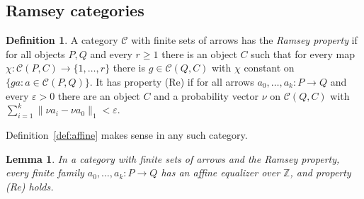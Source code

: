 \documentclass[11pt,a4paper]{article}
\newtheorem{lemma}[theorem]{Lemma}
\theoremstyle{definition}
\newtheorem{definition}[theorem]{Definition}
\newcommand{\C}{\mathcal{C}}
\newcommand{\Z}{\mathbb{Z}}
\begin{document}
\subsection{Ramsey categories}

\begin{definition}\label{def:RP}
A category $\C$ with finite sets of arrows has the \emph{Ramsey property}
if for all objects $P,Q$ and every $r\ge1$ there is an object $C$ such that
for every map $\chi\colon\C(P,C)\to\{1,\dots,r\}$ there is $g\in\C(Q,C)$
with $\chi$ constant on $\{ga:a\in\C(P,Q)\}$. It has property
\textup{(Re)} if for all arrows $a_0,\dots,a_k\colon P\to Q$ and every
$\varepsilon>0$ there are an object $C$ and a probability vector $\nu$ on
$\C(Q,C)$ with $\sum_{i=1}^k\|\nu a_i-\nu a_0\|_1<\varepsilon$.
\end{definition}

Definition~\ref{def:affine} makes sense in any such category.

\begin{lemma}\label{lem:ramsey}
In a category with finite sets of arrows and the Ramsey property, every
finite family $a_0,\dots,a_k\colon P\to Q$ has an affine equalizer over $\Z$,
and property \textup{(Re)} holds.
\end{lemma}
\end{document}
